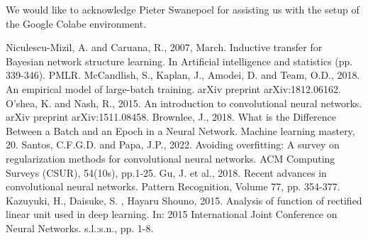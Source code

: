 \documentclass[conference]{IEEEtran}
\begin{document}
We would like to acknowledge Pieter Swanepoel for assisting us with the setup of the Google Colabe environment.






\begin{thebibliography}{00}
 Niculescu-Mizil, A. and Caruana, R., 2007, March. Inductive transfer for Bayesian network structure learning. In Artificial intelligence and statistics (pp. 339-346). PMLR.
 McCandlish, S., Kaplan, J., Amodei, D. and Team, O.D., 2018. An empirical model of large-batch training. arXiv preprint arXiv:1812.06162.
 O'shea, K. and Nash, R., 2015. An introduction to convolutional neural networks. arXiv preprint arXiv:1511.08458.
 Brownlee, J., 2018. What is the Difference Between a Batch and an Epoch in a Neural Network. Machine learning mastery, 20.
 Santos, C.F.G.D. and Papa, J.P., 2022. Avoiding overfitting: A survey on regularization methods for convolutional neural networks. ACM Computing Surveys (CSUR), 54(10s), pp.1-25.
 Gu, J. et al., 2018. Recent advances in convolutional neural networks. Pattern Recognition, Volume 77, pp. 354-377.
 Kazuyuki, H., Daisuke, S. , Hayaru Shouno, 2015. Analysis of function of rectified linear unit used in deep learning. In: 2015 International Joint Conference on Neural Networks. s.l.:s.n., pp. 1-8.
\end{thebibliography}
\end{document}
